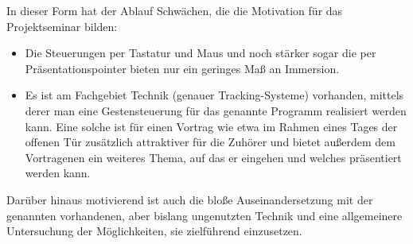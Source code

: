 In dieser Form hat der Ablauf Schwächen, die die Motivation für das Projektseminar bilden:
\begin{itemize}
	\item Die Steuerungen per Tastatur und Maus und noch stärker sogar die per Präsentationspointer bieten nur ein geringes Maß an Immersion.
	\item Es ist am Fachgebiet Technik (genauer Tracking-Systeme) vorhanden, mittels derer man eine Gestensteuerung für das genannte Programm realisiert werden kann. Eine solche ist für einen Vortrag wie etwa im Rahmen eines Tages der offenen Tür zusätzlich attraktiver für die Zuhörer und bietet außerdem dem Vortragenen ein weiteres Thema, auf das er eingehen und welches präsentiert werden kann.
\end{itemize}
Darüber hinaus motivierend ist auch die bloße Auseinandersetzung mit der genannten vorhandenen, aber bislang ungenutzten Technik und eine allgemeinere Untersuchung der Möglichkeiten, sie zielführend einzusetzen.